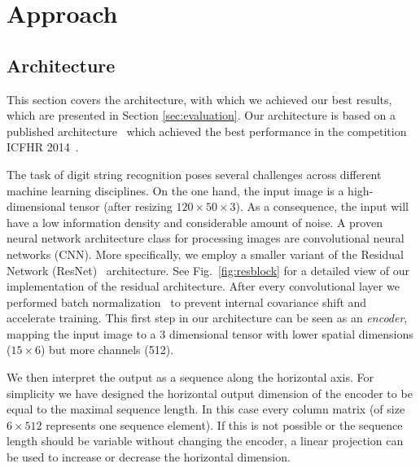 \section{Approach}\label{sec:approach}

\subsection{Architecture}\label{subsec:architecture}
This section covers the architecture, with which we achieved our best results, which are presented in Section \ref{sec:evaluation}. Our architecture is based on a published architecture~\cite{CTC} which achieved the best performance in the competition ICFHR 2014~\cite{icfhr_competition}.

The task of digit string recognition poses several challenges across different machine learning disciplines.
On the one hand, the input image is a high-dimensional tensor (after resizing $120\times50\times3$).
As a consequence, the input will have a low information density and considerable amount of noise.
A proven neural network architecture class for processing images are convolutional neural networks (CNN).
More specifically, we employ a smaller variant of the Residual Network (ResNet)~\cite{ResNet} architecture.
See Fig.~\ref{fig:resblock} for a detailed view of our implementation of the residual architecture.
After every convolutional layer we performed batch normalization~\cite{batchnorm} to prevent internal covariance shift and accelerate training.
This first step in our architecture can be seen as an \emph{encoder}, mapping the input image to a 3 dimensional tensor with lower spatial dimensions ($15 \times 6$) but more channels (512).

We then interpret the output as a sequence along the horizontal axis.
For simplicity we have designed the horizontal output dimension of the encoder to be equal to the maximal sequence length.
In this case every column matrix (of size $6 \times 512$ represents one sequence element).
If this is not possible or the sequence length should be variable without changing the encoder, a linear projection can be used to increase or decrease the horizontal dimension.

